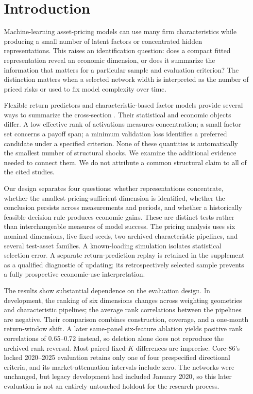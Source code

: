 \section{Introduction}

Machine-learning asset-pricing models can use many firm characteristics while producing a small number of latent factors or concentrated hidden representations. This raises an identification question: does a compact fitted representation reveal an economic dimension, or does it summarize the information that matters for a particular sample and evaluation criterion? The distinction matters when a selected network width is interpreted as the number of priced risks or used to fix model complexity over time.

Flexible return predictors and characteristic-based factor models provide several ways to summarize the cross-section \citep{gu2020empirical,kelly2019characteristics,gu2021autoencoder,chen2024deep}. Their statistical and economic objects differ. A low effective rank of activations measures concentration; a small factor set concerns a payoff span; a minimum validation loss identifies a preferred candidate under a specified criterion. None of these quantities is automatically the smallest number of structural shocks. We examine the additional evidence needed to connect them. We do not attribute a common structural claim to all of the cited studies.

Our design separates four questions: whether representations concentrate, whether the smallest pricing-sufficient dimension is identified, whether the conclusion persists across measurements and periods, and whether a historically feasible decision rule produces economic gains. These are distinct tests rather than interchangeable measures of model success. The pricing analysis uses six nominal dimensions, five fixed seeds, two archived characteristic pipelines, and several test-asset families. A known-loading simulation isolates statistical selection error. A separate return-prediction replay is retained in the supplement as a qualified diagnostic of updating; its retrospectively selected sample prevents a fully prospective economic-use interpretation.

The results show substantial dependence on the evaluation design. In development, the ranking of six dimensions changes across weighting geometries and characteristic pipelines; the average rank correlations between the pipelines are negative. Their comparison combines construction, coverage, and a one-month return-window shift. A later same-panel six-feature ablation yields positive rank correlations of 0.65--0.72 instead, so deletion alone does not reproduce the archived rank reversal. Most paired fixed-$K$ differences are imprecise. Core-86's locked 2020--2025 evaluation retains only one of four prespecified directional criteria, and its market-attenuation intervals include zero. The networks were unchanged, but legacy development had included January 2020, so this later evaluation is not an entirely untouched holdout for the research process.

